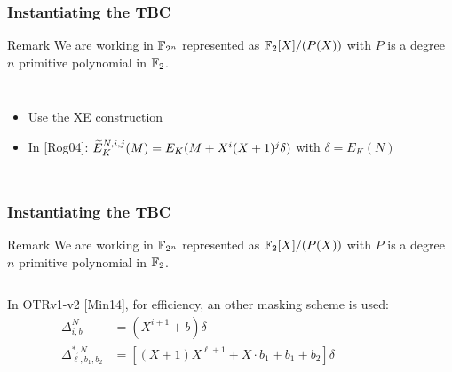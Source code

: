 \documentclass{beamer}
\begin{document}
	\begin{frame}
		\frametitle{Instantiating the TBC}

		\begin{alertblock}{Remark}
			We are working in $\F_{2^n}$ represented as $\F_2[X]/(P(X))$ with $P$ is a degree $n$ primitive polynomial in $\F_2$.
		\end{alertblock}

	    \begin{columns}
	\begin{itemize}
		\item Use the XE construction
	
		\item In {[Rog04]}: $\tE^{N,i,j}_{K}(M) = E_K(M + X^i (X+1)^j \delta)$ with $\delta = E_K(N)$
		
		
	\end{itemize}
					\begin{tikzpicture}[
						scale=1,
						node distance=1.8cm,
						line width = 0.5pt,
					]
						
					\end{tikzpicture}
		\end{columns}
	\end{frame}

	\begin{frame}
		\frametitle{Instantiating the TBC}

		\begin{alertblock}{Remark}
			We are working in $\F_{2^n}$ represented as $\F_2[X]/(P(X))$ with $P$ is a degree $n$ primitive polynomial in $\F_2$.
		\end{alertblock}

	    \begin{columns}
	     \column{.8\textwidth}
		 
		 In OTRv1-v2 {[Min14]}, for efficiency, an other masking scheme is used:
		 \begin{align*}
   		 	\Delta^{N}_{i,b} &= (X^{i+1} + b) \delta \\
   		 	\Delta^{*,N}_{\ell,b_1,b_2} &= [(X+1)X^{\ell+1} + X\cdot b_1 +b_1 +b_2]\delta \\
		 \end{align*}

	     \column{.2\textwidth}
					\begin{tikzpicture}[
						scale=1,
						node distance=1.8cm,
						line width = 0.5pt,
					]
						
					\end{tikzpicture}
		\end{columns}
	\end{frame}
\end{document}
